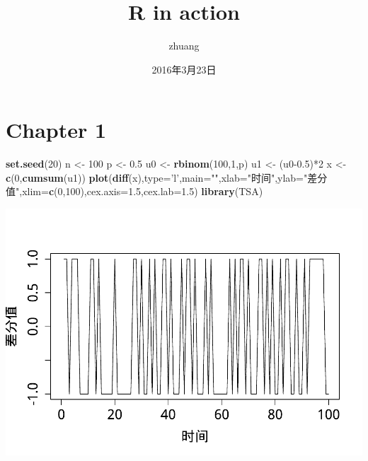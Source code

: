 \documentclass[]{article}
\title{R in action}
\author{zhuang}
\date{2016年3月23日}
\newenvironment{Shaded}{\begin{snugshade}}{\end{snugshade}}
\newcommand{\KeywordTok}[1]{\textcolor[rgb]{0.13,0.29,0.53}{\textbf{{#1}}}}
\newcommand{\DataTypeTok}[1]{\textcolor[rgb]{0.13,0.29,0.53}{{#1}}}
\newcommand{\DecValTok}[1]{\textcolor[rgb]{0.00,0.00,0.81}{{#1}}}
\newcommand{\FloatTok}[1]{\textcolor[rgb]{0.00,0.00,0.81}{{#1}}}
\newcommand{\StringTok}[1]{\textcolor[rgb]{0.31,0.60,0.02}{{#1}}}
\newcommand{\NormalTok}[1]{{#1}}
\begin{document}
\maketitle

{
\setcounter{tocdepth}{2}
\tableofcontents
}
\section{Chapter 1}\label{chapter-1}

\begin{Shaded}
\begin{Highlighting}[]
\KeywordTok{set.seed}\NormalTok{(}\DecValTok{20}\NormalTok{)}
\NormalTok{n <-}\StringTok{ }\DecValTok{100}
\NormalTok{p <-}\StringTok{ }\FloatTok{0.5}
\NormalTok{u0 <-}\StringTok{ }\KeywordTok{rbinom}\NormalTok{(}\DecValTok{100}\NormalTok{,}\DecValTok{1}\NormalTok{,p)}
\NormalTok{u1 <-}\StringTok{ }\NormalTok{(u0}\FloatTok{-0.5}\NormalTok{)*}\DecValTok{2}
\NormalTok{x <-}\StringTok{ }\KeywordTok{c}\NormalTok{(}\DecValTok{0}\NormalTok{,}\KeywordTok{cumsum}\NormalTok{(u1))}
\KeywordTok{plot}\NormalTok{(}\KeywordTok{diff}\NormalTok{(x),}\DataTypeTok{type=}\StringTok{'l'}\NormalTok{,}\DataTypeTok{main=}\StringTok{""}\NormalTok{,}\DataTypeTok{xlab=}\StringTok{"时间"}\NormalTok{,}\DataTypeTok{ylab=}\StringTok{"差分值"}\NormalTok{,}\DataTypeTok{xlim=}\KeywordTok{c}\NormalTok{(}\DecValTok{0}\NormalTok{,}\DecValTok{100}\NormalTok{),}\DataTypeTok{cex.axis=}\FloatTok{1.5}\NormalTok{,}\DataTypeTok{cex.lab=}\FloatTok{1.5}\NormalTok{)}
\KeywordTok{library}\NormalTok{(TSA)}
\end{Highlighting}
\end{Shaded}

\includegraphics{time_series_files/figure-latex/unnamed-chunk-1-1.pdf}
\end{document}
